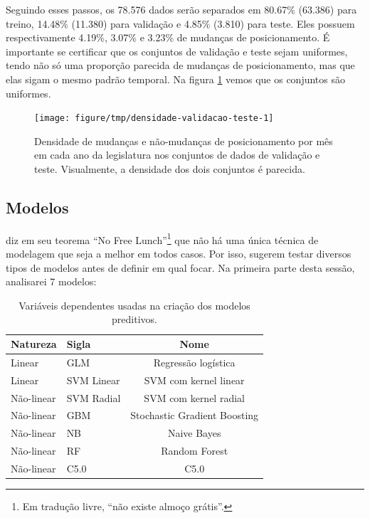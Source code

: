 \documentclass[a4paper,titlepage]{ppgi}\usepackage[]{graphicx}\usepackage[]{color}
\newenvironment{knitrout}{}{} %
\begin{document}
Seguindo esses passos, os 78.576 dados serão separados em
80.67\% (63.386)
para treino, 14.48\%
(11.380) para validação e 4.85\% (3.810) para teste. Eles possuem
respectivamente 4.19\%,
3.07\% e
3.23\% de mudanças de
posicionamento. É importante se certificar que os conjuntos de validação e
teste sejam uniformes, tendo não só uma proporção parecida de mudanças de
posicionamento, mas que elas sigam o mesmo padrão temporal. Na figura
\ref{fig:densidade-validacao-teste} vemos que os conjuntos são uniformes.

\begin{knitrout}
\color{fgcolor}\begin{figure}
\texttt{[image: figure/tmp/densidade-validacao-teste-1]} \caption[Densidade de mudanças e não-mudanças de posicionamento por mês em cada ano da legislatura nos conjuntos de dados de validação e teste]{Densidade de mudanças e não-mudanças de posicionamento por mês em cada ano da legislatura nos conjuntos de dados de validação e teste. Visualmente, a densidade dos dois conjuntos é parecida.}\label{fig:densidade-validacao-teste}
\end{figure}


\end{knitrout}

\subsection{Modelos}

 diz em seu teorema ``No Free Lunch''\footnote{Em
tradução livre, ``não existe almoço grátis''.} que não há uma única técnica de
modelagem que seja a melhor em todos casos. Por isso, 
sugerem testar diversos tipos de modelos antes de definir em qual focar. Na
primeira parte desta sessão, analisarei 7 modelos:

\begin{table}
\centering
\begin{tabular}{l l c}
  Natureza & Sigla & Nome \\
  \hline
  Linear & GLM & Regressão logística \\
  Linear & SVM Linear & SVM com kernel linear \\
  Não-linear & SVM Radial & SVM com kernel radial \\
  Não-linear & GBM & Stochastic Gradient Boosting \\
  Não-linear & NB & Naive Bayes \\
  Não-linear & RF & Random Forest\\
  Não-linear & C5.0 & C5.0 \\
\end{tabular}
\caption{Variáveis dependentes usadas na criação dos modelos preditivos.}
\label{table:tipos-de-modelos}
\end{table}
\end{document}
